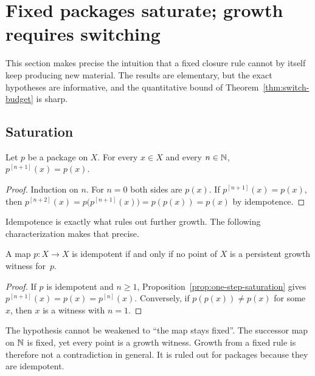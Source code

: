 \section{Fixed packages saturate; growth requires switching}\label{sec:fixed-package}

This section makes precise the intuition that a fixed closure rule cannot by itself keep producing new material. The results are elementary, but the exact hypotheses are informative, and the quantitative bound of Theorem~\ref{thm:switch-budget} is sharp.

\subsection{Saturation}

\begin{proposition}\label{prop:one-step-saturation}
Let $p$ be a package on $X$. For every $x\in X$ and every $n\in\mathbb{N}$, $p^{[n+1]}(x)=p(x)$.
\end{proposition}

\begin{proof}
Induction on $n$. For $n=0$ both sides are $p(x)$. If $p^{[n+1]}(x)=p(x)$, then $p^{[n+2]}(x)=p\bigl(p^{[n+1]}(x)\bigr)=p(p(x))=p(x)$ by idempotence.
\end{proof}

Idempotence is exactly what rules out further growth. The following characterization makes that precise.

\begin{theorem}\label{thm:idempotent-iff}
A map $p\colon X\to X$ is idempotent if and only if no point of $X$ is a persistent growth witness for~$p$.
\end{theorem}

\begin{proof}
If $p$ is idempotent and $n\ge 1$, Proposition~\ref{prop:one-step-saturation} gives $p^{[n+1]}(x)=p(x)=p^{[n]}(x)$. Conversely, if $p(p(x))\neq p(x)$ for some $x$, then $x$ is a witness with $n=1$.
\end{proof}

The hypothesis cannot be weakened to ``the map stays fixed''. The successor map on $\mathbb{N}$ is fixed, yet every point is a growth witness. Growth from a fixed rule is therefore not a contradiction in general. It is ruled out for packages because they are idempotent.

